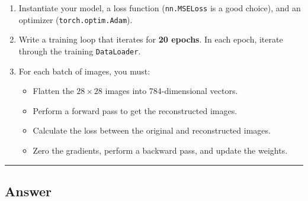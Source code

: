 \documentclass[
  letterpaper,
  DIV=11,
  numbers=noendperiod]{scrartcl}
\providecommand{\tightlist}{%
  \setlength{\itemsep}{0pt}\setlength{\parskip}{0pt}}\usepackage{longtable,booktabs,array}
\begin{document}
\begin{enumerate}
\def\labelenumi{\arabic{enumi}.}
\tightlist
\item
  Instantiate your model, a loss function (\texttt{nn.MSELoss} is a good
  choice), and an optimizer (\texttt{torch.optim.Adam}).
\item
  Write a training loop that iterates for \textbf{20 epochs}. In each
  epoch, iterate through the training \texttt{DataLoader}.
\item
  For each batch of images, you must:

  \begin{itemize}
  \tightlist
  \item
    Flatten the \(28\times28\) images into 784-dimensional vectors.
  \item
    Perform a forward pass to get the reconstructed images.
  \item
    Calculate the loss between the original and reconstructed images.
  \item
    Zero the gradients, perform a backward pass, and update the weights.
  \end{itemize}
\end{enumerate}

\begin{center}\rule{0.5\linewidth}{0.5pt}\end{center}

\subsection{Answer}\label{answer-5}
\end{document}
